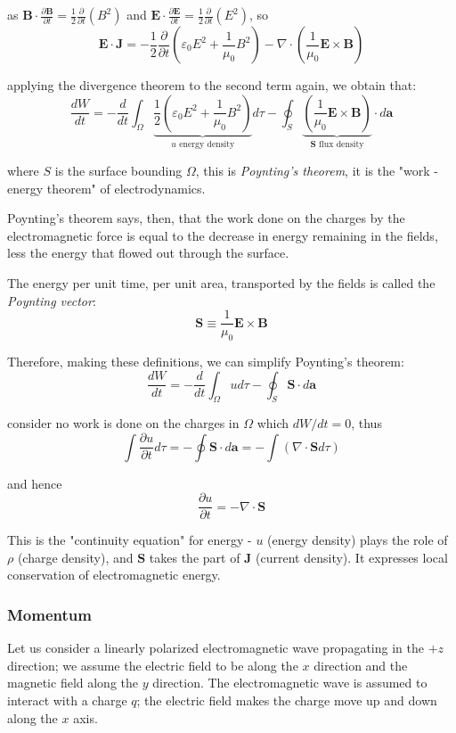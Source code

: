 \documentclass[openany]{book}
\begin{document}
as $\mathbf{B}\cdot \frac{\partial \mathbf{B}}{\partial t}=\frac{1}{2}\frac{\partial }{\partial t}(B^2)$ and $\mathbf{E}\cdot \frac{\partial \mathbf{E}}{\partial t}=\frac{1}{2}\frac{\partial }{\partial t}(E^2)$, so
\[\mathbf{E}\cdot \mathbf{J}=-\frac{1}{2}\frac{\partial }{\partial t}\left(\varepsilon _0E^2+\frac{1}{\mu_0}B^2\right)-\nabla \cdot (\frac{1}{\mu _0}\mathbf{E}\times \mathbf{B})\]

applying the divergence theorem to the second term again, we obtain that:
\[\frac{dW}{dt}=-\frac{d}{dt}\int _{\Omega }\underbrace{\frac{1}{2}\left(\varepsilon _0E^2+\frac{1}{\mu_0}B^2\right)}_{u\text{ energy density}}d\tau - \oint _{S}\underbrace{\left(\frac{1}{\mu _0}\mathbf{E}\times \mathbf{B}\right)}_{\mathbf{S}\text{ flux density}}\cdot d\mathbf{a}\]

where $S$ is the surface bounding $\Omega $, this is \emph{Poynting's theorem}, it is the "work - energy theorem" of electrodynamics. 

Poynting's theorem says, then, that the work done on the charges by the electromagnetic force is equal to the decrease in energy remaining in the fields, less the energy that flowed out through the surface.

The energy per unit time, per unit area, transported by the fields is called the \emph{Poynting vector}:
\[\mathbf{S}\equiv \frac{1}{\mu _0}\mathbf{E}\times \mathbf{B}\]

Therefore, making these definitions, we can simplify Poynting's theorem:
\[\frac{dW}{dt}=-\frac{d}{dt}\int _{\Omega }ud\tau - \oint _{S}\mathbf{S}\cdot d\mathbf{a}\]

consider no work is done on the charges in $\Omega $ which $dW/dt=0$, thus
\[\int \frac{\partial u}{\partial t}d\tau =-\oint \mathbf{S}\cdot d\mathbf{a}=-\int (\nabla \cdot \mathbf{S}d\tau )\]

and hence
\[\frac{\partial u}{\partial t}=-\nabla \cdot \mathbf{S}\]

This is the "continuity equation" for energy - $u$ (energy density) plays the role of $\rho $ (charge density), and $\mathbf{S}$ takes the part of $\mathbf{J}$ (current density). It expresses local conservation of electromagnetic energy. 

\subsubsection{Momentum}
Let us consider a linearly polarized electromagnetic wave propagating in the $+z$ direction; we assume the electric field to be along the $x$ direction and the magnetic field along the $y$ direction. The electromagnetic wave is assumed to interact with a charge $q$; the electric field makes the charge move up and down along the $x$ axis.
\end{document}
